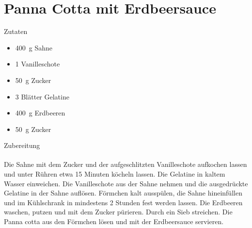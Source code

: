 \section*{Panna Cotta mit Erdbeersauce}
\ihead{}\ohead{}
\cfoot{}
{\Large Zutaten}
\begin{multicols}{2}
\begin{itemize}
    \item \SI{400}{g} Sahne
    \item \num{1} Vanilleschote
    \item \SI{50}{g} Zucker
    \item \num{3} Blätter Gelatine
    \item \SI{400}{g} Erdbeeren
    \item \SI{50}{g} Zucker
\end{itemize}
\end{multicols}
\noindent
{\Large Zubereitung}\\
\\
Die Sahne mit dem Zucker und der aufgeschlitzten Vanilleschote aufkochen lassen und unter Rühren etwa 15 Minuten köcheln lassen.
Die Gelatine in kaltem Wasser einweichen.
Die Vanilleschote aus der Sahne nehmen und die ausgedrückte Gelatine in der Sahne auflösen. 
Förmchen kalt ausspülen, die Sahne hineinfüllen und im Kühlschrank in mindestens 2 Stunden fest werden lassen.
Die Erdbeeren waschen, putzen und mit dem Zucker pürieren. Durch ein Sieb streichen.
Die Panna cotta aus den Förmchen lösen und mit der Erdbeersauce servieren.
